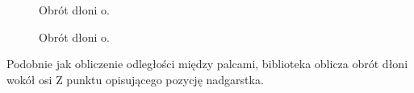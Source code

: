 \begin{figure}[H]
    \centering
    \hfill
    \caption{Obrót dłoni o.}
\end{figure}

\begin{figure}[H]
    \centering
    \hfill
    \caption{Obrót dłoni o.}
\end{figure}

\quad Podobnie jak obliczenie odległości między palcami, biblioteka oblicza obrót dłoni wokół osi Z punktu opisującego pozycję nadgarstka.